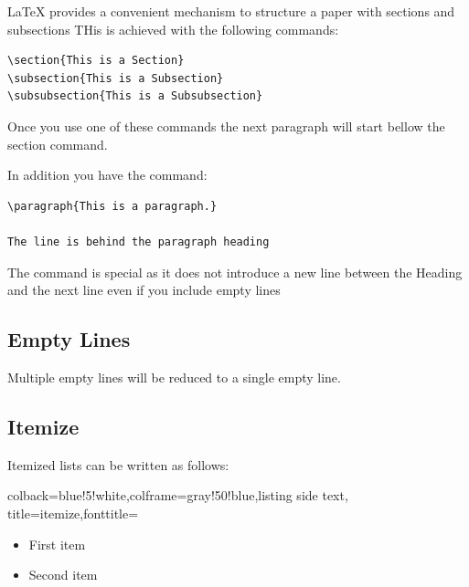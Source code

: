 LaTeX provides a convenient mechanism to structure a paper with sections
and subsections THis is achieved with the following commands:

\begin{verbatim}
\section{This is a Section}
\subsection{This is a Subsection}
\subsubsection{This is a Subsubsection}  
\end{verbatim}

Once you use one of these commands the next paragraph will start bellow
the section command.

In addition you have the command:

\begin{verbatim}
\paragraph{This is a paragraph.}

The line is behind the paragraph heading
\end{verbatim}

The command is special as it does not introduce a new line between the
Heading and the next line even if you include empty lines

\subsection{Empty Lines}\label{empty-lines}

Multiple empty lines will be reduced to a single empty line.

\subsection{Itemize}\label{itemize}


Itemized lists can be written as follows:


\begin{tcblisting}{colback=blue!5!white,colframe=gray!50!blue,listing side text,
  title=itemize,fonttitle=\bfseries}
\begin{itemize}
   \item First item
   \item Second item
\end{itemize}
\end{tcblisting} 


